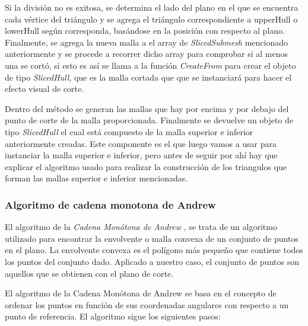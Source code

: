 Si la división no es exitosa, se determina el lado del plano en el que se encuentra cada vértice del triángulo y se agrega el triángulo correspondiente a upperHull o lowerHull según corresponda, basándose en la posición con respecto al plano. Finalmente, se agrega la nueva malla a el array de \textit{SlicedSubmesh} mencionado anteriormente y se procede a recorrer dicho array para comprobar si al menos una se cortó, si esto es así se llama a la función \textit{CreateFrom} para crear el objeto de tipo \textit{SlicedHull}, que es la malla cortada que que se instanciará para hacer el efecto visual de corte.

Dentro del método se generan las mallas que hay por encima y por debajo del punto de corte de la malla proporcionada. Finalmente se devuelve un objeto de tipo \textit{SlicedHull} el cual está compuesto de la malla superior e inferior anteriormente creadas. Este componente es el que luego vamos a usar para instanciar la malla superior e inferior, pero antes de seguir por ahí hay que explicar el algoritmo usado para realizar la construcción de los triangulos que forman las mallas superior e inferior mencionadas.

\subsubsection{Algoritmo de cadena monotona de Andrew} 

El algoritmo de la \textit{Cadena Monótona de Andrew} \cite{MonotoneChain}, se trata de un algoritmo utilizado para encontrar la envolvente o malla convexa de un conjunto de puntos en el plano. La envolvente convexa es el polígono más pequeño que contiene todos los puntos del conjunto dado. Aplicado a nuestro caso, el conjunto de puntos son aquellos que se obtienen con el plano de corte.

El algoritmo de la Cadena Monótona de Andrew se basa en el concepto de ordenar los puntos en función de sus coordenadas angulares con respecto a un punto de referencia. El algoritmo sigue los siguientes pasos:

